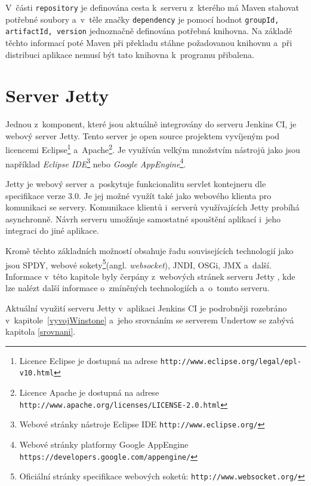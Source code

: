         V~části \texttt{repository} je definována cesta k~serveru z~kterého má Maven stahovat potřebné soubory
        a~v~těle značky \texttt{dependency} je pomocí hodnot \texttt{groupId, artifactId, version} jednoznačně
        definována potřebná knihovna. Na základě těchto informací poté Maven při překladu stáhne požadovanou
        knihovnu a~při distribuci aplikace nemusí být tato knihovna k~programu přibalena. 


    \section{Server Jetty} \label{jetty}
        Jednou z~komponent, které jsou aktuálně integrovány do serveru Jenkins CI, je webový server Jetty.
        Tento server je open source projektem vyvíjeným pod licencemi 
        Eclipse\footnote{Licence Eclipse je dostupná na adrese \texttt{http://www.eclipse.org/legal/epl-v10.html}}
    a~Apache\footnote{Licence Apache je dostupná 
        na adrese \texttt{http://www.apache.org/licenses/LICENSE-2.0.html}}. 
            Je využíván velkým množstvím nástrojů jako jsou například \emph{Eclipse IDE}\footnote{Webové stránky nástroje Eclipse IDE 
        \texttt{http://www.eclipse.org/}} nebo \emph{Google AppEngine}\footnote{Webové stránky platformy Google AppEngine
        \texttt{https://developers.google.com/appengine/}}.

        Jetty je webový server a~poskytuje funkcionalitu servlet kontejneru dle specifikace verze 3.0. 
        Je jej možné využít také jako webového klienta pro komunikaci se servery. Komunikace
        klientů i~serverů využívajících Jetty probíhá asynchronně. 
        Návrh serveru umožňuje samostatné spouštění aplikací i~jeho integraci do jiné aplikace. 

        Kromě těchto základních možností obsahuje
        řadu souvisejících technologií jako jsou SPDY, webové sokety\footnote{Oficiální stránky 
            specifikace webových soketů: \texttt{http://www.websocket.org/}}(angl. \emph{websocket}),
        JNDI, OSGi, JMX a~další. 
        Informace v~této kapitole byly čerpány z~webových stránek serveru Jetty \cite{jettyWeb}, kde lze nalézt 
        další informace o~zmíněných technologiích a~o~tomto serveru.
        
        Aktuální využití serveru Jetty v~aplikaci Jenkins CI je podrobněji rozebráno
        v~kapitole~\ref{vyvojWinstone} a~jeho srovnáním se serverem Undertow se 
        zabývá kapitola \ref{srovnani}.
        

